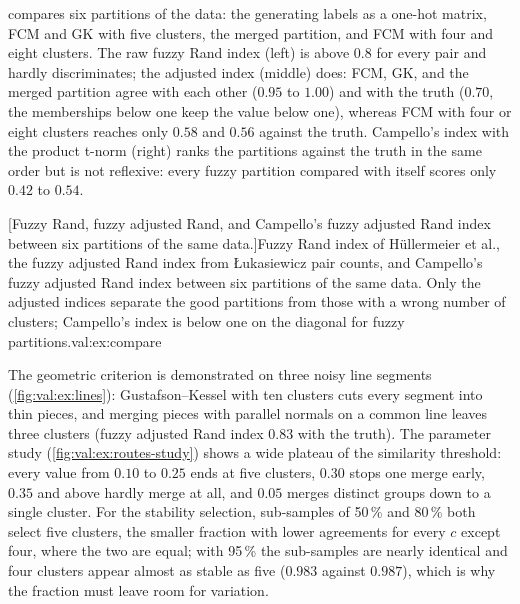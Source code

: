  compares six partitions of the data: the generating labels as a one-hot matrix, FCM and GK with five clusters, the merged partition, and FCM with four and eight clusters. The raw fuzzy Rand index (left) is above $0.8$ for every pair and hardly discriminates; the adjusted index (middle) does: FCM, GK, and the merged partition agree with each other ($0.95$ to $1.00$) and with the truth ($0.70$, the memberships below one keep the value below one), whereas FCM with four or eight clusters reaches only $0.58$ and $0.56$ against the truth. Campello's index with the product t-norm (right) ranks the partitions against the truth in the same order but is not reflexive: every fuzzy partition compared with itself scores only $0.42$ to $0.54$.

[Fuzzy Rand, fuzzy adjusted Rand, and Campello's fuzzy adjusted Rand index between six partitions of the same data.]{Fuzzy Rand index of Hüllermeier et al., the fuzzy adjusted Rand index from Łukasiewicz pair counts, and Campello's fuzzy adjusted Rand index between six partitions of the same data. Only the adjusted indices separate the good partitions from those with a wrong number of clusters; Campello's index is below one on the diagonal for fuzzy partitions.}{val:ex:compare}

The geometric criterion is demonstrated on three noisy line segments (\cref{fig:val:ex:lines}): Gustafson--Kessel with ten clusters cuts every segment into thin pieces, and merging pieces with parallel normals on a common line leaves three clusters (fuzzy adjusted Rand index $0.83$ with the truth). The parameter study (\cref{fig:val:ex:routes-study}) shows a wide plateau of the similarity threshold: every value from $0.10$ to $0.25$ ends at five clusters, $0.30$ stops one merge early, $0.35$ and above hardly merge at all, and $0.05$ merges distinct groups down to a single cluster. For the stability selection, sub-samples of 50\,\% and 80\,\% both select five clusters, the smaller fraction with lower agreements for every $c$ except four, where the two are equal; with 95\,\% the sub-samples are nearly identical and four clusters appear almost as stable as five ($0.983$ against $0.987$), which is why the fraction must leave room for variation.


